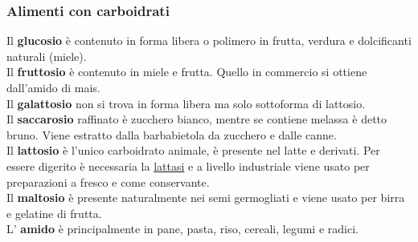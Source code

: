 \documentclass[10pt]{article}
\begin{document}
\subsubsection{Alimenti con carboidrati}
Il \textbf{glucosio} è contenuto in forma libera o polimero in frutta, verdura e dolcificanti naturali (miele).\\
Il \textbf{fruttosio} è contenuto in miele e frutta. Quello in commercio si ottiene dall'amido di mais.\\ 
Il \textbf{galattosio} non si trova in forma libera ma solo sottoforma di lattosio.\\
Il \textbf{saccarosio} raffinato è zucchero bianco, mentre se contiene melassa è detto bruno. Viene estratto dalla barbabietola da zucchero e dalle canne. \\
Il \textbf{lattosio} è l'unico carboidrato animale, è presente nel latte e derivati. Per essere digerito è necessaria la \underline{lattasi} e a livello industriale viene usato per preparazioni a fresco e come conservante. \\
Il \textbf{maltosio} è presente naturalmente nei semi germogliati e viene usato per birra e gelatine di frutta.\\
L' \textbf{amido} è principalmente in pane, pasta, riso, cereali, legumi e radici.
\end{document}

